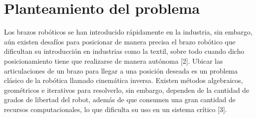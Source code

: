 \newpage
\section{Planteamiento del problema}

Los brazos robóticos se han introducido rápidamente en la industria, sin embargo, aún existen desafíos para posicionar de manera precisa el brazo robótico que dificultan su introducción en industrias como la textil, sobre todo cuando dicho posicionamiento tiene que realizarse de manera autónoma [2].
\newline\newline\newline
Ubicar las articulaciones de un brazo para llegar a una posición deseada es un problema clásico de la robótica llamado cinemática inversa. Existen métodos algebraicos, geométricos e iterativos para resolverlo, sin embargo, dependen de la cantidad de grados de libertad del robot, además de que consumen una gran cantidad de recursos computacionales, lo que dificulta su uso en un sistema crítico [3].